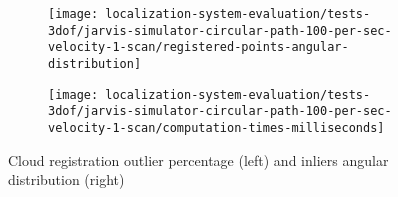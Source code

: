 \begin{figure}[hb]
	\centering
	\begin{subfigure}[h]{0.47\textwidth}
		\centering
		\texttt{[image: localization-system-evaluation/tests-3dof/jarvis-simulator-circular-path-100-per-sec-velocity-1-scan/registered-points-angular-distribution]}
	\end{subfigure}
	\begin{subfigure}[h]{0.47\textwidth}
		\centering
		\texttt{[image: localization-system-evaluation/tests-3dof/jarvis-simulator-circular-path-100-per-sec-velocity-1-scan/computation-times-milliseconds]}
	\end{subfigure}
	\caption{Cloud registration outlier percentage (left) and inliers angular distribution (right)}
	\label{fig:localization-system-evaluation_jarvis-simulator-circular-path-100-per-sec-velocity-1-scan_angular-distribution-analysis-computation-time}
\end{figure}
